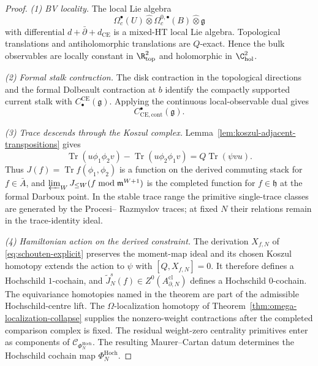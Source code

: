 \documentclass[11pt]{memoir}
\begin{document}
\begin{proof}

  \emph{(1) BV locality.}
  The local Lie algebra
  \[
    \Omega^\bullet_c(U)\widehat\otimes
    \Omega^{0,\bullet}_c(B)\widehat\otimes
    \mathfrak g
  \]
  with differential \(d+\bar\partial+d_{\mathrm{CE}}\) is a
  mixed-HT local Lie algebra.  Topological translations and
  antiholomorphic translations are \(Q\)-exact.  Hence the bulk
  observables are locally constant in \(\R^2_{\mathrm{top}}\) and
  holomorphic in \(\C^2_{\mathrm{hol}}\).

	  \emph{(2) Formal stalk contraction.}
	  The disk contraction in the topological directions and the formal
	  Dolbeault contraction at \(b\) identify the compactly supported
	  current stalk with
	  \(C^{\mathrm{CE}}_\bullet(\mathfrak g)\).
	  Applying the continuous local-observable dual gives
	  \[
	    C^\bullet_{\mathrm{CE},\mathrm{cont}}(\mathfrak g).
  \]

  \emph{(3) Trace descends through the Koszul complex.}
  Lemma~\ref{lem:koszul-adjacent-transpositions} gives
  \[
    \operatorname{Tr}(u\phi_1\phi_2v)
    -\operatorname{Tr}(u\phi_2\phi_1v)
    =Q\operatorname{Tr}(\psi vu).
  \]
  Thus \(J(f)=\operatorname{Tr}f(\phi_1,\phi_2)\) is a function on
  the derived commuting stack for \(f\in\bar A\), and
  \(\varprojlim_WJ_{\leq W}(f\bmod\mathfrak m^{W+1})\) is the completed
  function for \(f\in\mathfrak h\) at the formal Darboux point.  In the stable trace range the
  primitive single-trace classes are generated by the Procesi--
  Razmyslov traces; at fixed \(N\) their relations remain in the
  trace-identity ideal.

  \emph{(4) Hamiltonian action on the derived constraint.}
  The derivation \(X_{f,N}\) of
  \eqref{eq:schouten-explicit} preserves the moment-map ideal and its
  chosen Koszul homotopy extends the action to \(\psi\) with
  \([Q,X_{f,N}]=0\).  It therefore defines a Hochschild
  \(1\)-cochain, and
  \(\widetilde J_N^s(f)\in Z^0(A^{\mathrm{cl}}_{\partial,N})\)
  defines a Hochschild
  \(0\)-cochain.  The equivariance homotopies named in the theorem are
  part of the admissible Hochschild-centre lift.  The
  \(\Omega\)-localization homotopy of
  Theorem~\ref{thm:omega-localization-collapse} supplies the nonzero-weight
  contractions after the completed comparison complex is fixed.  The
  residual weight-zero centrality primitives enter as components of
  \(\mathcal C_{\Phi_N^{\mathrm{Hoch}}}\).  The resulting Maurer--Cartan
  datum determines the Hochschild cochain map
  \(\Phi_N^{\mathrm{Hoch}}\).


\end{proof}
\end{document}
